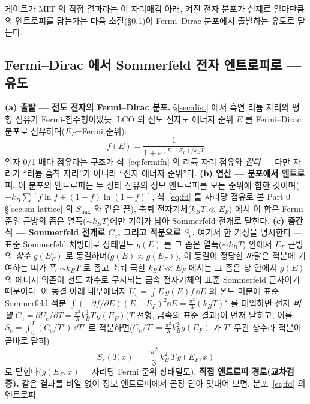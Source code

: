 게이트가 MIT 의 직접 결과라는 이 자리매김 아래, 켜진 전자 분포가 실제로 얼마만큼의 엔트로피를 담는가는
다음 소절(\S\ref{sec:lco-Se})이 Fermi--Dirac 분포에서 출발하는 유도로 닫는다.

\subsection{Fermi--Dirac 에서 Sommerfeld 전자 엔트로피로 --- 유도}\label{sec:lco-Se}
\textbf{(a) 출발 --- 전도 전자의 Fermi--Dirac 분포.} \S\ref{sec:dist} 에서 흑연 리튬 자리의 평형 점유가 Fermi-함수형이었듯, LCO 의 전도 전자도 에너지 준위 $E$ 를
Fermi--Dirac 분포로 점유하며($E_F$=Fermi 준위):
\begin{equation}
f(E)=\frac{1}{1+e^{(E-E_F)/k_BT}}
\label{eq:fd}
\end{equation}
입자 0/1 배타 점유라는 구조가 식~\eqref{eq:fermifn} 의 리튬 자리 점유와 \emph{같다} --- 다만 자리가 ``리튬 흡착
자리''가 아니라 ``전자 에너지 준위''다. \textbf{(b) 연산 --- 분포에서 엔트로피.} 이 분포의 엔트로피는 두 상태 점유의 정보 엔트로피를 모든 준위에 합한 것이며($-k_B\sum[f\ln f+(1-f)\ln(1-f)]$,
식~\eqref{eq:fd} 를 자리당 점유로 본 Part 0 \S\ref{sec:sm-lattice} 의 $S_\mathrm{mix}$ 와 같은 꼴), 축퇴 전자기체($k_BT\!\ll\!E_F$)
에서 이 합은 Fermi 준위 근방의 좁은 열폭($\sim k_BT$)에만 기여가 남아 Sommerfeld 전개로 닫힌다. \textbf{(c) 중간식 --- Sommerfeld 전개로 $C_e$, 그리고 적분으로 $S_e$.}
여기서 한 가정을 명시한다 --- 표준 Sommerfeld 처방대로 상태밀도 $g(E)$ 를 그 좁은 열폭($\sim k_BT$) 안에서 $E_F$
근방의 \emph{상수} $g(E_F)$ 로 동결하며($g(E)\approx g(E_F)$), 이 동결이 정당한 까닭은 적분에 기여하는 띠가 폭
$\sim k_BT$ 로 좁고 축퇴 극한 $k_BT\!\ll\!E_F$ 에서는 그 좁은 창 안에서 $g(E)$ 의 에너지 의존이 선도 차수로
무시되는 금속 전자기체의 표준 Sommerfeld 근사이기 때문이다. 이 동결 아래 내부에너지 $U_e=\int E\,g(E)f\,\dd E$ 의
온도 미분에 표준 Sommerfeld 적분 $\int(-\partial f/\partial E)(E-E_F)^2\dd E=\tfrac{\pi^2}{3}(k_BT)^2$ 를 대입하면
전자 \emph{비열} $C_e=\partial U_e/\partial T=\tfrac{\pi^2}{3}k_B^2T\,g(E_F)$($T$-선형, 금속의 표준 결과)이 먼저
닫히고, 이를 $S_e=\int_0^T (C_e/T')\,\dd T'$ 로 적분하면($C_e/T'=\tfrac{\pi^2}{3}k_B^2g(E_F)$ 가 $T'$ 무관 상수라
적분이 곧바로 닫혀)
\begin{equation}
S_e(T,x)\;=\;\frac{\pi^2}{3}\,k_B^2\,T\,g(E_F,x)
\label{eq:Se}
\end{equation}
로 닫힌다($g(E_F,x)$ = 자리당 Fermi 준위 상태밀도). \textbf{직접 엔트로피 경로(교차검증).} 같은 결과를 비열 없이 정보 엔트로피에서 곧장 닫아 맞대어 보면, 분포~\eqref{eq:fd} 의 엔트로피
